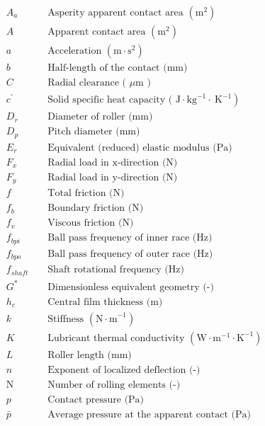 \begin{align*}
	&A_a && \text { Asperity apparent contact area }\left(\mathrm{m}^2\right) \\
	&A && \text { Apparent contact area }\left(\mathrm{m}^2\right) \\
	&a && \text { Acceleration }\left(\mathrm{m \cdot s}^{2}\right) \\
	&b && \text { Half-length of the contact (mm) } \\
	&C && \text { Radial clearance ( } \mu \mathrm{m} \text { ) } \\
	&c^{\prime} && \text { Solid specific heat capacity ( } \left.\mathrm{J} \cdot \mathrm{kg}^{-1} \cdot \mathrm{~K}^{-1}\right) \\
	&D_r && \text { Diameter of roller (mm) } \\
	&D_p && \text { Pitch diameter (mm) } \\
	&E_r && \text { Equivalent (reduced) elastic modulus (Pa) } \\
	&F_x && \text { Radial load in x-direction (N) } \\
	&F_y && \text { Radial load in y-direction (N) } \\
	&f && \text { Total friction (N) } \\
	&f_b && \text { Boundary friction (N) } \\
	&f_v && \text { Viscous friction (N) } \\
	&f_{b p i} && \text { Ball pass frequency of inner race (Hz) } \\
	&f_{b p o} && \text { Ball pass frequency of outer race (Hz) } \\
	&f_{s h a f t} && \text { Shaft rotational frequency (Hz) } \\
	&G^* && \text { Dimensionless equivalent geometry (-) } \\
	&h_c && \text { Central film thickness (m) } \\
	&k && \text { Stiffness }\left(\mathrm{N \cdot m}^{-1}\right) \\
	&K && \text { Lubricant thermal conductivity } \left(\mathrm{W} \cdot \mathrm{m}^{-1} \cdot \mathrm{K}^{-1}\right) \\
	&L && \text { Roller length (mm) } \\
	&n && \text { Exponent of localized deflection (-) } \\
	&\mathrm{N} && \text { Number of rolling elements (-) } \\
	&p && \text { Contact pressure (Pa) } \\
	&\bar{p} && \text { Average pressure at the apparent contact (Pa) } \\

\end{align*}
